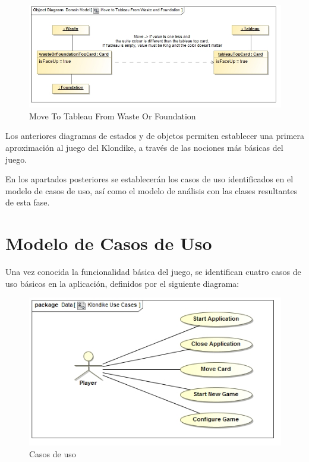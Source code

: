 \documentclass[11pt]{article}
\begin{document}
\begin{center}
 \begin{figure}[H]
 \begin{center}
   \includegraphics[width=15cm]{DomainModel/MoveToTableauFromWasteAndFoundation00.jpg}
   \caption{Move To Tableau From Waste Or Foundation}
   \label{fig:totableaufromwasteorfoundation}
 \end{center}
 \end{figure}
\end{center}

Los anteriores diagramas de estados y de objetos permiten establecer una primera aproximación al juego del Klondike, a través de las nociones más básicas del juego.

En los apartados posteriores se establecerán los casos de uso identificados en el modelo de casos de uso, así como el modelo de análisis con las clases resultantes de esta fase.

\pagebreak

\section{Modelo de Casos de Uso}

Una vez conocida la funcionalidad básica del juego, se identifican cuatro casos de uso básicos en la aplicación, definidos por el siguiente diagrama:

\begin{center}
 \begin{figure}[H]
 \begin{center}
   \includegraphics[width=15cm]{DomainModel/KlondikeUseCases02.jpg}
   \caption{Casos de uso}
   \label{fig:usecases}
 \end{center}
 \end{figure}
\end{center}
\end{document}
